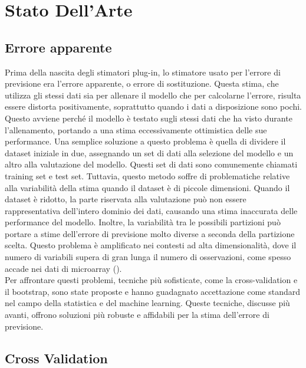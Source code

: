 \chapter{Stato Dell'Arte}
\label{ch:capitolo7}


\section{Errore apparente}
\label{sec:sezione7.1}


Prima della nascita degli stimatori plug-in, lo stimatore usato per l’errore di previsione era l’errore apparente, o errore di sostituzione. Questa stima, che utilizza gli stessi dati sia per allenare il modello %
che per calcolarne l’errore, risulta essere distorta positivamente, soprattutto quando i dati a disposizione sono pochi. Questo avviene perché il modello è testato sugli stessi dati che ha visto durante l'allenamento,%
portando a una stima eccessivamente ottimistica delle sue performance. Una semplice soluzione a questo problema è quella di dividere il dataset iniziale in due, assegnando un set di dati alla selezione del modello e un altro alla valutazione del modello. Questi set di dati sono comunemente chiamati training set e test set. Tuttavia, questo metodo soffre di problematiche relative alla variabilità della stima quando il dataset è di piccole dimensioni. Quando il dataset è ridotto, la parte riservata alla valutazione può non essere rappresentativa dell'intero dominio dei dati, causando una stima inaccurata delle performance del modello. Inoltre, la variabilità tra le possibili partizioni può portare a stime dell'errore di previsione molto diverse a seconda della partizione scelta. Questo problema è amplificato nei contesti ad alta dimensionalità, dove il numero di variabili supera di gran lunga il numero di osservazioni, come spesso accade nei dati di microarray (\textcite{mclachlan}).\\
Per affrontare questi problemi, tecniche più sofisticate, come la cross-validation e il bootstrap, sono state proposte e hanno guadagnato accettazione come standard nel campo della statistica e del machine learning. Queste tecniche, discusse più avanti, offrono soluzioni più robuste e affidabili per la stima dell'errore di previsione.


\section{Cross Validation}
\label{sec:sezione7.2}


